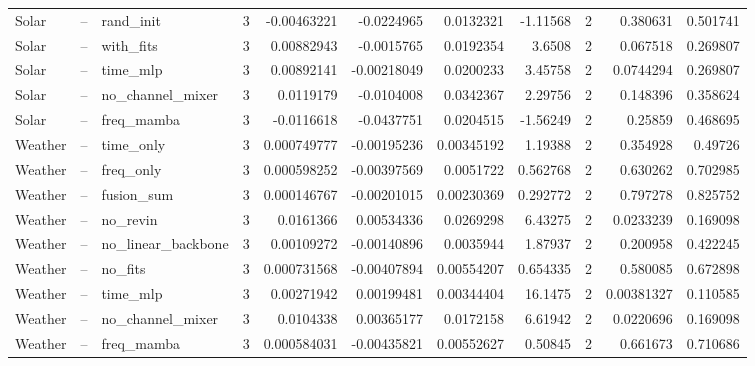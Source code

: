 \begin{longtable}{lllrrrrrrrr}
Solar & -- & rand\_init & 3 & -0.00463221 & -0.0224965 & 0.0132321 & -1.11568 & 2 & 0.380631 & 0.501741 \\
Solar & -- & with\_fits & 3 & 0.00882943 & -0.0015765 & 0.0192354 & 3.6508 & 2 & 0.067518 & 0.269807 \\
Solar & -- & time\_mlp & 3 & 0.00892141 & -0.00218049 & 0.0200233 & 3.45758 & 2 & 0.0744294 & 0.269807 \\
Solar & -- & no\_channel\_mixer & 3 & 0.0119179 & -0.0104008 & 0.0342367 & 2.29756 & 2 & 0.148396 & 0.358624 \\
Solar & -- & freq\_mamba & 3 & -0.0116618 & -0.0437751 & 0.0204515 & -1.56249 & 2 & 0.25859 & 0.468695 \\
Weather & -- & time\_only & 3 & 0.000749777 & -0.00195236 & 0.00345192 & 1.19388 & 2 & 0.354928 & 0.49726 \\
Weather & -- & freq\_only & 3 & 0.000598252 & -0.00397569 & 0.0051722 & 0.562768 & 2 & 0.630262 & 0.702985 \\
Weather & -- & fusion\_sum & 3 & 0.000146767 & -0.00201015 & 0.00230369 & 0.292772 & 2 & 0.797278 & 0.825752 \\
Weather & -- & no\_revin & 3 & 0.0161366 & 0.00534336 & 0.0269298 & 6.43275 & 2 & 0.0233239 & 0.169098 \\
Weather & -- & no\_linear\_backbone & 3 & 0.00109272 & -0.00140896 & 0.0035944 & 1.87937 & 2 & 0.200958 & 0.422245 \\
Weather & -- & no\_fits & 3 & 0.000731568 & -0.00407894 & 0.00554207 & 0.654335 & 2 & 0.580085 & 0.672898 \\
Weather & -- & time\_mlp & 3 & 0.00271942 & 0.00199481 & 0.00344404 & 16.1475 & 2 & 0.00381327 & 0.110585 \\
Weather & -- & no\_channel\_mixer & 3 & 0.0104338 & 0.00365177 & 0.0172158 & 6.61942 & 2 & 0.0220696 & 0.169098 \\
Weather & -- & freq\_mamba & 3 & 0.000584031 & -0.00435821 & 0.00552627 & 0.50845 & 2 & 0.661673 & 0.710686 \\
\bottomrule
\end{longtable}

